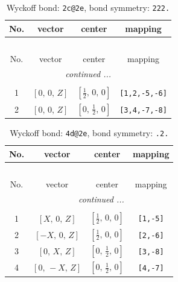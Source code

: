\documentclass[fleqn,8pt]{jsarticle}
\begin{document}
\begin{longtable}{cccc}
\caption{Wyckoff bond: {\tt 2c@2e}, bond symmetry: {\tt 222.}}
 \\
 \hline \hline
No. & vector & center & mapping \\ \hline \endfirsthead

\multicolumn{3}{l}{\tablename\ \thetable{}} \\
 \hline \hline
No. & vector & center & mapping \\ \hline \endhead

 \hline \hline
\multicolumn{3}{r}{\footnotesize\it continued ...} \\ \endfoot

 \hline \hline
\multicolumn{3}{r}{} \\ \endlastfoot

1 & $\left[ 0,\, 0,\, Z \right]$ & $\left[ \frac{1}{2},\, 0,\, 0 \right]$ & {\tt [1,2,-5,-6]} \\ \hline
2 & $\left[ 0,\, 0,\, Z \right]$ & $\left[ 0,\, \frac{1}{2},\, 0 \right]$ & {\tt [3,4,-7,-8]} \\
\end{longtable}
\renewcommand{\arraystretch}{1.2}
\begin{longtable}{cccc}
\caption{Wyckoff bond: {\tt 4d@2e}, bond symmetry: {\tt .2.}}
 \\
 \hline \hline
No. & vector & center & mapping \\ \hline \endfirsthead

\multicolumn{3}{l}{\tablename\ \thetable{}} \\
 \hline \hline
No. & vector & center & mapping \\ \hline \endhead

 \hline \hline
\multicolumn{3}{r}{\footnotesize\it continued ...} \\ \endfoot

 \hline \hline
\multicolumn{3}{r}{} \\ \endlastfoot

1 & $\left[ X,\, 0,\, Z \right]$ & $\left[ \frac{1}{2},\, 0,\, 0 \right]$ & {\tt [1,-5]} \\ \hline
2 & $\left[ - X,\, 0,\, Z \right]$ & $\left[ \frac{1}{2},\, 0,\, 0 \right]$ & {\tt [2,-6]} \\ \hline
3 & $\left[ 0,\, X,\, Z \right]$ & $\left[ 0,\, \frac{1}{2},\, 0 \right]$ & {\tt [3,-8]} \\ \hline
4 & $\left[ 0,\, - X,\, Z \right]$ & $\left[ 0,\, \frac{1}{2},\, 0 \right]$ & {\tt [4,-7]} \\
\end{longtable}
\end{document}
